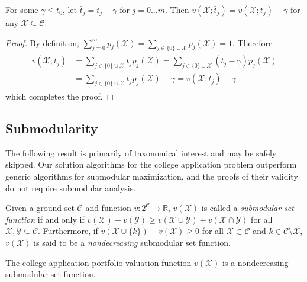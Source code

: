 \begin{lemma} \label{assumetzerozero}
For some $\gamma \leq t_0$, let $\bar t_j = t_j - \gamma$ for $j = 0 \dots m$. Then $v(\mathcal{X}; \bar t_j) = v(\mathcal{X};  t_j) -  \gamma$ for any $\mathcal{X} \subseteq \mathcal{C}$. 
\end{lemma}
\begin{proof}
By definition, $\sum_{j=0}^m p_j(\mathcal{X}) = \sum_{j \in \{0\}\cup\mathcal{X}} p_j(\mathcal{X}) = 1$. Therefore
\begin{align}
\begin{split}
v(\mathcal{X}; \bar t_j) &= \sum_{j\in \{0\}\cup\mathcal{X}}  \bar t_j p_j(\mathcal{X})
=\sum_{j\in \{0\}\cup\mathcal{X}} (t_j - \gamma) p_j(\mathcal{X}) \\
&=\sum_{j\in \{0\}\cup\mathcal{X}} t_j p_j(\mathcal{X})  - \gamma 
= v(\mathcal{X}; t_j) - \gamma
\end{split} 
\end{align}
which completes the proof.
\end{proof}


\subsection{Submodularity}

The following result is primarily of taxonomical interest and may be safely skipped. Our solution algorithms for the college application problem outperform generic algorithms for submodular maximization, and the proofs of their validity do not require submodular analysis.

\begin{definition}
Given a ground set $\mathcal{C}$ and function $v : 2^{\mathcal{C}} \mapsto \mathbb{R}$, $v(\mathcal{X})$ is called a \emph{submodular set function} if and only if $v(\mathcal{X}) + v(\mathcal{Y}) \geq v(\mathcal{X}\cup\mathcal{Y}) + v(\mathcal{X}\cap\mathcal{Y})$
for all $\mathcal{X}, \mathcal{Y} \subseteq \mathcal{C}$. Furthermore, if $ v(\mathcal{X}\cup\{k\}) - v(\mathcal{X}) \geq 0$ for all $\mathcal{X} \subset \mathcal{C}$ and $k \in \mathcal{C} \setminus \mathcal{X}$, $v(\mathcal{X})$ is said to be a \emph{nondecreasing} submodular set function.
\end{definition}

\begin{theorem}
The college application portfolio valuation function
$v(\mathcal{X})$ %
is a nondecreasing submodular set function.
\end{theorem}


